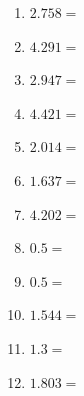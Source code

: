 \documentclass[12pt]{article}
\begin{document}
\begin{enumerate}
\item \large $ 2.758 = $ \vspace{1.5cm}
\item \large $ 4.291 = $ \vspace{1.5cm}
\newpage
\item \large $ 2.947 = $ \vspace{1.5cm}
\item \large $ 4.421 = $ \vspace{1.5cm}
\item \large $ 2.014 = $ \vspace{1.5cm}
\item \large $ 1.637 = $ \vspace{1.5cm}
\item \large $ 4.202 = $ \vspace{1.5cm}
\item \large $ 0.5 = $ \vspace{1.5cm}
\item \large $ 0.5 = $ \vspace{1.5cm}
\item \large $ 1.544 = $ \vspace{1.5cm}
\item \large $ 1.3 = $ \vspace{1.5cm}
\item \large $ 1.803 = $ \vspace{1.5cm}
\end{enumerate}\newpage
\end{document}
